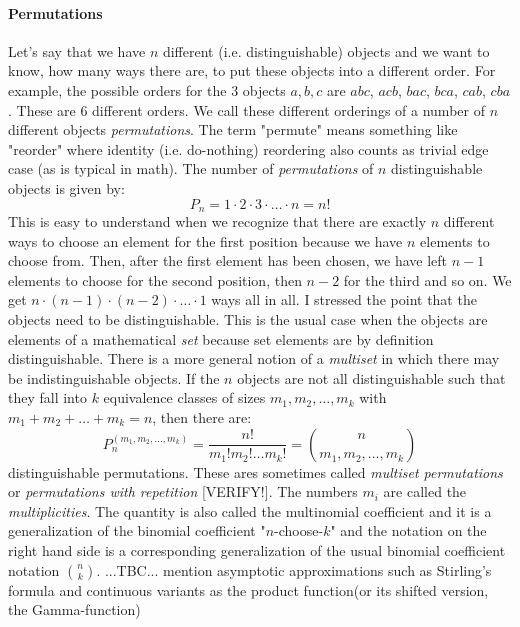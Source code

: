 \paragraph{Permutations}
Let's say that we have $n$ different (i.e. distinguishable) objects and we want to know, how many ways there are, to put these objects into a different order. For example, the possible orders for the $3$ objects $a,b,c$ are $abc$, $acb$, $bac$, $bca$, $cab$, $cba$. These are $6$ different orders. We call these different orderings of a number of $n$ different objects \emph{permutations}. The term "permute" means something like "reorder" where identity (i.e. do-nothing) reordering also counts as trivial edge case (as is typical in math). The number of \emph{permutations} of $n$ distinguishable objects is given by:
\begin{equation}
P_n = 1 \cdot 2 \cdot 3 \cdot \ldots \cdot n = n!
\end{equation}
This is easy to understand when we recognize that there are exactly $n$ different ways to choose an element for the first position because we have $n$ elements to choose from. Then, after the first element has been chosen, we have left $n-1$ elements to choose for the second position, then $n-2$ for the third and so on. We get $n\cdot(n-1)\cdot(n-2)\cdot\ldots\cdot1$ ways all in all. I stressed the point that the objects need to be distinguishable. This is the usual case when the objects are elements of a mathematical \emph{set} because set elements are by definition distinguishable. There is a more general notion of a \emph{multiset} in which there may be indistinguishable objects. If the $n$ objects are not all distinguishable such that they fall into $k$ equivalence classes of sizes $m_1, m_2, \ldots, m_k$ with $m_1 + m_2 + \ldots + m_k = n$, then there are:
\begin{equation}
P_n^{(m_1,m_2,\ldots,m_k)} 
= \frac{n!}{m_1! m_2! \ldots m_k!} 
= \binom{n}{m_1,m_2,\ldots, m_k}
\end{equation}
distinguishable permutations. These ares sometimes called \emph{multiset permutations} or \emph{permutations with repetition} [VERIFY!]. The numbers $m_i$ are called the \emph{multiplicities}. The quantity is also called the multinomial coefficient and it is a generalization of the binomial coefficient "$n$-choose-$k$" and the notation on the right hand side is a corresponding generalization of the usual binomial coefficient notation $\binom{n}{k}$. ...TBC... mention asymptotic approximations such as Stirling's formula and continuous variants as the product function(or its shifted version, the Gamma-function)

